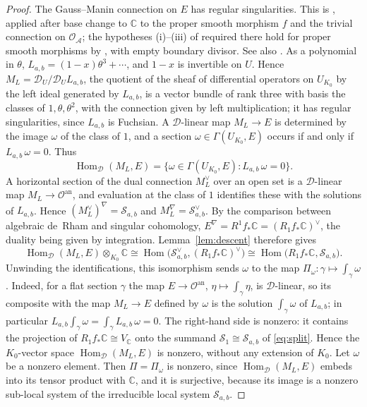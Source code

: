\documentclass[11pt]{amsart}
\theoremstyle{definition}
\theoremstyle{remark}
\numberwithin{equation}{section}
\newcommand{\C}{\mathbb{C}}
\newcommand{\cS}{\mathcal{S}}
\newcommand{\cO}{\mathcal{O}}
\newcommand{\cD}{\mathcal{D}}
\newcommand{\cA}{\mathcal{A}}
\DeclareMathOperator{\Hom}{Hom}
\newcommand{\Sab}{\cS_{a,b}}
\begin{document}
\begin{proof}
The Gauss--Manin connection on $E$ has regular singularities. This is \citet[Th\'eor\`eme~II.7.9]{Deligne1970}, applied after base change to $\C$ to the proper smooth morphism $f$ and the trivial connection on $\cO_\cA$; the hypotheses (i)--(iii) of \citet[Th\'eor\`eme~II.6.13]{Deligne1970} required there hold for proper smooth morphisms by \citet[Proposition~II.6.14]{Deligne1970}, with empty boundary divisor. See also \citet{Katz1970}. As a polynomial in $\theta$, $L_{a,b}=(1-x)\theta^3+\cdots$, and $1-x$ is invertible on $U$. Hence $M_L=\cD_U/\cD_UL_{a,b}$, the quotient of the sheaf of differential operators on $U_{K_0}$ by the left ideal generated by $L_{a,b}$, is a vector bundle of rank three with basis the classes of $1,\theta,\theta^2$, with the connection given by left multiplication; it has regular singularities, since $L_{a,b}$ is Fuchsian. A $\cD$-linear map $M_L\to E$ is determined by the image $\omega$ of the class of $1$, and a section $\omega\in\Gamma(U_{K_0},E)$ occurs if and only if $L_{a,b}\,\omega=0$. Thus
\[
\Hom_{\cD}(M_L,E)=\{\omega\in\Gamma(U_{K_0},E):L_{a,b}\,\omega=0\}.
\]
A horizontal section of the dual connection $M_L^\vee$ over an open set is a $\cD$-linear map $M_L\to\cO^{\mathrm{an}}$, and evaluation at the class of $1$ identifies these with the solutions of $L_{a,b}$. Hence $(M_L^\vee)^\nabla=\Sab$ and $M_L^\nabla=\Sab^\vee$. By the comparison between algebraic de~Rham and singular cohomology, $E^\nabla=R^1f_*\C=(R_1f_*\C)^\vee$, the duality being given by integration. Lemma~\ref{lem:descent} therefore gives
\[
\Hom_{\cD}(M_L,E)\otimes_{K_0}\C\cong\Hom\big(\Sab^\vee,(R_1f_*\C)^\vee\big)\cong\Hom\big(R_1f_*\C,\Sab\big).
\]
Unwinding the identifications, this isomorphism sends $\omega$ to the map $\Pi_\omega:\gamma\mapsto\int_\gamma\omega$. Indeed, for a flat section $\gamma$ the map $E\to\cO^{\mathrm{an}}$, $\eta\mapsto\int_\gamma\eta$, is $\cD$-linear, so its composite with the map $M_L\to E$ defined by $\omega$ is the solution $\int_\gamma\omega$ of $L_{a,b}$; in particular $L_{a,b}\int_\gamma\omega=\int_\gamma L_{a,b}\,\omega=0$. The right-hand side is nonzero: it contains the projection of $R_1f_*\C\cong V_\C$ onto the summand $\cS_1\cong\Sab$ of \eqref{eq:split}. Hence the $K_0$-vector space $\Hom_{\cD}(M_L,E)$ is nonzero, without any extension of $K_0$. Let $\omega$ be a nonzero element. Then $\Pi=\Pi_\omega$ is nonzero, since $\Hom_\cD(M_L,E)$ embeds into its tensor product with $\C$, and it is surjective, because its image is a nonzero sub-local system of the irreducible local system $\Sab$.
\end{proof}
\end{document}

